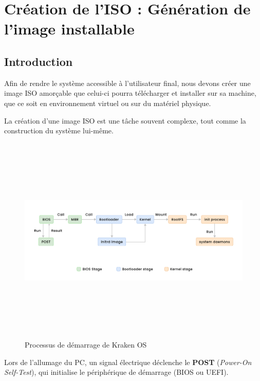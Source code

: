 
\chapter{  Création de l'ISO : Génération de l'image installable}
\minitoc
\clearpage




\section{Introduction}

Afin de rendre le système accessible à l'utilisateur final, nous devons créer une image ISO amorçable que celui-ci pourra télécharger et installer sur sa machine, que ce soit en environnement virtuel ou sur du matériel physique.

La création d’une image ISO est une tâche souvent complexe, tout comme la construction du système lui-même.

\begin{figure}[H]
  \centering
  \includegraphics[width=1\textwidth, height=10cm]{images_pfe/bootloader process.png}
  \caption{Processus de démarrage de Kraken OS}
  \label{fig:kbootproc}
\end{figure}

Lors de l’allumage du PC, un signal électrique déclenche le \textbf{POST} (\emph{Power-On Self-Test}), qui initialise le périphérique de démarrage (BIOS ou UEFI).\\

